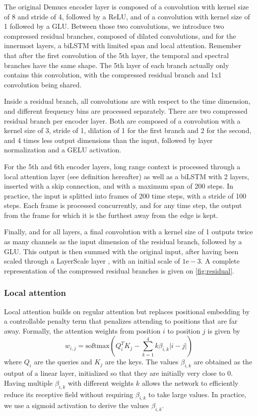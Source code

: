 \documentclass[10pt,a4paper,onecolumn]{article}
\begin{document}
The original Demucs encoder layer is composed of a convolution with
kernel size of 8 and stride of 4, followed by a ReLU, and of a
convolution with kernel size of 1 followed by a GLU. Between those two
convolutions, we introduce two compressed residual branches, composed of
dilated convolutions, and for the innermost layers, a biLSTM with
limited span and local attention. Remember that after the first
convolution of the 5th layer, the temporal and spectral branches have
the same shape. The 5th layer of each branch actually only contains this
convolution, with the compressed residual branch and 1x1 convolution
being shared.

Inside a residual branch, all convolutions are with respect to the time
dimension, and different frequency bins are processed separately. There
are two compressed residual branch per encoder layer. Both are composed
of a convolution with a kernel size of 3, stride of 1, dilation of 1 for
the first branch and 2 for the second, and 4 times less output
dimensions than the input, followed by layer normalization
\citep{layernorm} and a GELU activation.

For the 5th and 6th encoder layers, long range context is processed
through a local attention layer (see definition hereafter) as well as a
biLSTM with 2 layers, inserted with a skip connection, and with a
maximum span of 200 steps. In practice, the input is splitted into
frames of 200 time steps, with a stride of 100 steps. Each frame is
processed concurrently, and for any time step, the output from the frame
for which it is the furthest away from the edge is kept.

Finally, and for all layers, a final convolution with a kernel size of 1
outputs twice as many channels as the input dimension of the residual
branch, followed by a GLU. This output is then summed with the original
input, after having been scaled through a LayerScale layer
\citep{layerscale}, with an initial scale of \(1\mathrm{e}{-}3\). A
complete representation of the compressed residual branches is given on
\ref{fig:residual}.

\hypertarget{local-attention}{%
\subsubsection{Local attention}\label{local-attention}}

Local attention builds on regular attention \citep{attention} but
replaces positional embedding by a controllable penalty term that
penalizes attending to positions that are far away. Formally, the
attention weights from position \(i\) to position \(j\) is given by \[
w_{i, j} = \mathrm{softmax}(Q_i^T K_j - \sum_{k=1}^4 k \beta_{i, k} |i -j|) \]
where \(Q_i\) are the queries and \(K_j\) are the keys. The values
\(\beta_{i, k}\) are obtained as the output of a linear layer,
initialized so that they are initially very close to 0. Having multiple
\(\beta_{i, k}\) with different weights \(k\) allows the network to
efficiently reduce its receptive field without requiring
\(\beta_{i, k}\) to take large values. In practice, we use a sigmoid
activation to derive the values \(\beta_{i, k}\).
\end{document}
